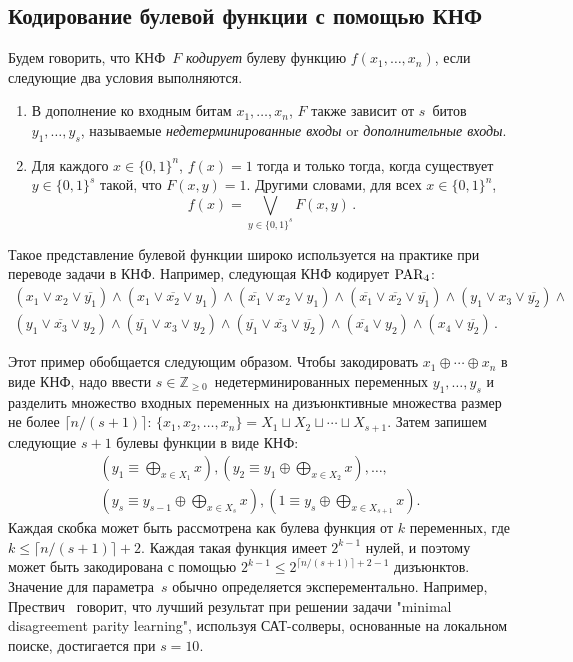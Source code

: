 \subsection{Кодирование булевой функции с помощью КНФ}\label{sec:encodings}
Будем говорить, что КНФ~$F$ \emph{кодирует} булеву функцию $f(x_1, \dotsc, x_n)$, если следующие два условия выполняются.
\begin{enumerate}
	\item В дополнение ко входным битам $x_1, \dotsc, x_n$, $F$ также зависит от $s$~битов $y_1, \dotsc, y_s$, называемые \emph{недетерминированные входы} or \emph{дополнительные входы}.
	\item Для каждого $x \in \{0,1\}^n$, $f(x)=1$ тогда и только тогда, когда существует $y \in \{0,1\}^s$ такой, что $F(x,y)=1$. Другими словами, для всех $x \in \{0,1\}^n$,
	\begin{equation}\label{eq:enc}
		f(x) = \bigvee_{y \in \{0,1\}^s}F(x,y) \, .
	\end{equation}
\end{enumerate}
Такое представление булевой функции широко используется на практике при переводе задачи в КНФ.
Например, следующая КНФ кодирует $\operatorname{PAR}_4$:
\begin{multline}\label{eq:toyenc}
	(x_1 \lor x_2 \lor \overline{y_1}) \land (x_1 \lor  \overline{x_2} \lor y_1) \land (\overline{x_1} \lor x_2 \lor y_1) \land (\overline{x_1} \lor \overline{x_2} \lor \overline{y_1})
	\land
	(y_1 \lor x_3 \lor \overline{y_2}) \land\\ (y_1 \lor  \overline{x_3} \lor y_2) \land (\overline{y_1} \lor x_3 \lor y_2) \land (\overline{y_1} \lor \overline{x_3} \lor \overline{y_2})
	\land (\overline{x_4} \lor y_2) \land (x_4 \lor \overline{y_2}) \, .
\end{multline}

Этот пример обобщается следующим образом.
Чтобы закодировать $x_1 \oplus \dotsb \oplus x_n$ в виде КНФ,
надо ввести
$s \in \mathbb{Z}_{\ge 0}$~недетерминированных переменных $y_1, \dotsc, y_s$
и разделить множество входных переменных на дизъюнктивные множества размер не более $\lceil n/(s+1) \rceil$: $\{x_1, x_2, \dotsc, x_n\}=X_1 \sqcup X_2 \sqcup \dotsb \sqcup X_{s+1}$. 
Затем запишем следующие $s+1$ булевы функции в виде КНФ:
\begin{multline}\label{eq:blocks}
	\left(y_1 \equiv \bigoplus_{x \in X_1}x\right),
	\left(y_2 \equiv y_1 \oplus \bigoplus_{x \in X_2}x\right), \dotsc,\\
	\left(y_s \equiv y_{s-1} \oplus \bigoplus_{x \in X_s}x\right),
	\left(1 \equiv y_s \oplus \bigoplus_{x \in X_{s+1}}x\right).
\end{multline}
Каждая скобка может быть рассмотрена как булева функция от $k$ переменных, где $k \le \lceil n/(s+1) \rceil + 2$. Каждая такая функция имеет  $2^{k - 1}$ нулей, и поэтому может быть закодирована с помощью $2^{k - 1} \le 2^{\lceil n/(s+1) \rceil+2-1}$ дизъюнктов.
Значение для параметра~$s$ обычно определяется эксперементально. 
Например, Прествич~\cite{DBLP:journals/dam/Prestwich03} говорит, 
что лучший результат при решении задачи "minimal disagreement parity learning", используя САТ-солверы, основанные на локальном поиске, достигается при $s=10$.

